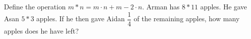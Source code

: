 Define the operation $m*n=m \cdot n+m-2 \cdot n$. Arman has $8*11$ apples. He gave Asan $5*3$ apples. If he then gave Aidan $\dfrac{1}{4}$ of the remaining apples, how many apples does he have left?
